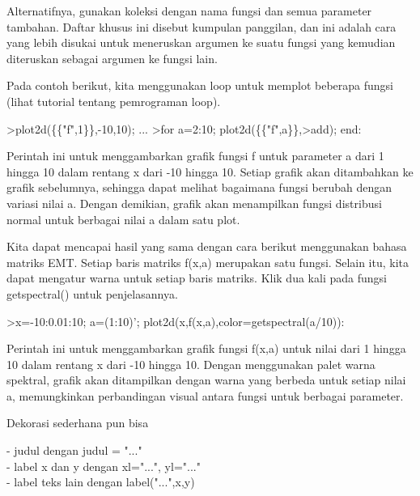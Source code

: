 \documentclass{article}
\begin{document}
\begin{eulernotebook}
\begin{eulercomment}
\begin{eulercomment}
\begin{eulercomment}
\begin{eulercomment}
\begin{eulercomment}
\begin{eulercomment}
\begin{eulercomment}
\begin{eulercomment}
\begin{eulercomment}
Alternatifnya, gunakan koleksi dengan nama fungsi dan semua parameter
tambahan. Daftar khusus ini disebut kumpulan panggilan, dan ini adalah
cara yang lebih disukai untuk meneruskan argumen ke suatu fungsi yang
kemudian diteruskan sebagai argumen ke fungsi lain.

Pada contoh berikut, kita menggunakan loop untuk memplot beberapa
fungsi (lihat tutorial tentang pemrograman loop).
\end{eulercomment}
\begin{eulerprompt}
>plot2d(\{\{"f",1\}\},-10,10); ...
>for a=2:10; plot2d(\{\{"f",a\}\},>add); end:
\end{eulerprompt}
\begin{eulercomment}
Perintah ini untuk menggambarkan grafik fungsi f untuk parameter a
dari 1 hingga 10 dalam rentang x dari -10 hingga 10. Setiap grafik
akan ditambahkan ke grafik sebelumnya, sehingga dapat melihat
bagaimana fungsi berubah dengan variasi nilai a. Dengan demikian,
grafik akan menampilkan fungsi distribusi normal untuk berbagai nilai
a dalam satu plot.

Kita dapat mencapai hasil yang sama dengan cara berikut menggunakan
bahasa matriks EMT. Setiap baris matriks f(x,a) merupakan satu fungsi.
Selain itu, kita dapat mengatur warna untuk setiap baris matriks. Klik
dua kali pada fungsi getspectral() untuk penjelasannya.
\end{eulercomment}
\begin{eulerprompt}
>x=-10:0.01:10; a=(1:10)'; plot2d(x,f(x,a),color=getspectral(a/10)):
\end{eulerprompt}
\begin{eulercomment}
Perintah ini untuk menggambarkan grafik fungsi f(x,a) untuk nilai dari
1 hingga 10 dalam rentang x dari -10 hingga 10. Dengan menggunakan
palet warna spektral, grafik akan ditampilkan dengan warna yang
berbeda untuk setiap nilai a, memungkinkan perbandingan visual antara
fungsi untuk berbagai parameter.

\end{eulercomment}
\begin{eulercomment}
Dekorasi sederhana pun bisa

- judul dengan judul = "..."\\
- label x dan y dengan xl="...", yl="..."\\
- label teks lain dengan label("...",x,y)


\end{eulercomment}
\end{eulercomment}
\end{eulercomment}
\end{eulercomment}
\end{eulercomment}
\end{eulercomment}
\end{eulercomment}
\end{eulercomment}
\end{eulercomment}
\end{eulernotebook}
\end{document}
